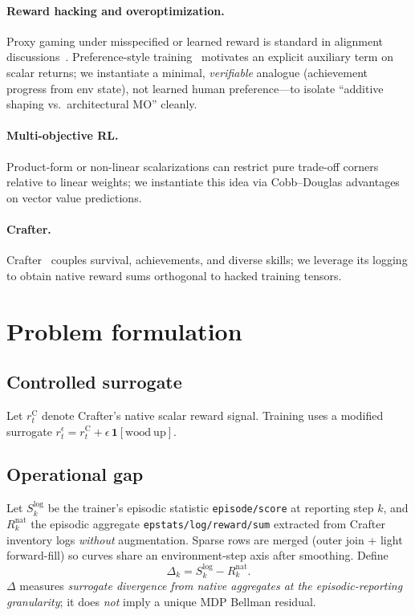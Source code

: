 \documentclass[10pt,twocolumn]{article}
\theoremstyle{definition}
\begin{document}
\paragraph{Reward hacking and overoptimization.} Proxy gaming under misspecified or learned reward is standard in alignment discussions~\cite{gao2022scaling}. Preference-style training~\cite{christiano2017rlhf} motivates an explicit auxiliary term on scalar returns; we instantiate a minimal, \emph{verifiable} analogue (achievement progress from env state), not learned human preference---to isolate ``additive shaping vs.\ architectural MO'' cleanly.

\paragraph{Multi-objective RL.} Product-form or non-linear scalarizations can restrict pure trade-off corners relative to linear weights; we instantiate this idea via Cobb--Douglas advantages on vector value predictions.

\paragraph{Crafter.} Crafter~\cite{hafner2021crafter} couples survival, achievements, and diverse skills; we leverage its logging to obtain native reward sums orthogonal to hacked training tensors.

\section{Problem formulation}
\subsection{Controlled surrogate}
Let \(r^{\mathrm{C}}_t\) denote Crafter's native scalar reward signal. Training uses a modified surrogate \(r^{\epsilon}_t = r^{\mathrm{C}}_t + \epsilon\,\mathbf{1}[\mathrm{wood\ up}]\).

\subsection{Operational gap}
Let \(S^{\mathrm{log}}_k\) be the trainer's episodic statistic \texttt{episode/score} at reporting step \(k\), and \(R^{\mathrm{nat}}_k\) the episodic aggregate \texttt{epstats/log/reward/sum} extracted from Crafter inventory logs \emph{without} augmentation. Sparse rows are merged (outer join + light forward-fill) so curves share an environment-step axis after smoothing. Define
\begin{equation}
\Delta_k = S^{\mathrm{log}}_k - R^{\mathrm{nat}}_k .
\end{equation}
\(\Delta\) measures \emph{surrogate divergence from native aggregates at the episodic-reporting granularity}; it does \emph{not} imply a unique MDP Bellman residual.
\end{document}
